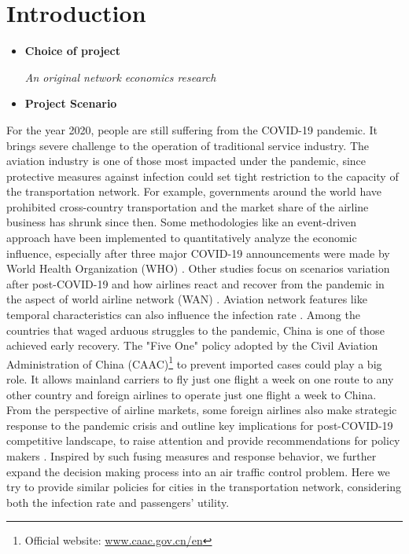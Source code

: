 \section{Introduction}

\begin{itemize}
    \item \textbf{Choice of project}
    
    \emph{An original network economics research}

    \item \textbf{Project Scenario}
\end{itemize}

For the year 2020, people are still suffering from the COVID-19 pandemic. It brings severe challenge to the operation of traditional service industry. The aviation industry is one of those most impacted under the pandemic, since protective measures against infection could set tight restriction to the capacity of the transportation network. For example, governments around the world have prohibited cross-country transportation and the market share of the airline business has shrunk since then. Some methodologies like an event-driven approach have been implemented to quantitatively analyze the economic influence, especially after three major COVID-19 announcements were made by World Health Organization (WHO) \cite{maneenop2020impacts}. Other studies focus on scenarios variation after post-COVID-19 and how airlines react and recover from the pandemic in the aspect of world airline network (WAN) \cite{ye2020scenarios}. Aviation network features like temporal characteristics can also influence the infection rate \cite{scire2017}. Among the countries that waged arduous struggles to the pandemic, China is one of those achieved early recovery. The "Five One" policy adopted by the Civil Aviation Administration of China (CAAC)\footnote{Official website: \url{www.caac.gov.cn/en}} to prevent imported cases could play a big role. It allows mainland carriers to fly just one flight a week on one route to any other country and foreign airlines to operate just one flight a week to China. From the perspective of airline markets, some foreign airlines also make strategic response to the pandemic crisis and outline key implications for post-COVID-19 competitive landscape, to raise attention and provide recommendations for policy makers \cite{albers2020european} \cite{budd2020european}. Inspired by such fusing measures and response behavior, we further expand the decision making process into an air traffic control problem. Here we try to provide similar policies for cities in the transportation network, considering both the infection rate and passengers' utility.

